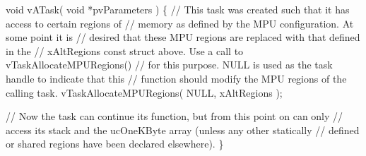 \begin{DoxyPre}void vATask( void *pvParameters )
\{
    // This task was created such that it has access to certain regions of
    // memory as defined by the MPU configuration.  At some point it is
    // desired that these MPU regions are replaced with that defined in the
    // xAltRegions const struct above.  Use a call to vTaskAllocateMPURegions()
    // for this purpose.  NULL is used as the task handle to indicate that this
    // function should modify the MPU regions of the calling task.
    vTaskAllocateMPURegions( NULL, xAltRegions );\end{DoxyPre}



\begin{DoxyPre}    // Now the task can continue its function, but from this point on can only
    // access its stack and the ucOneKByte array (unless any other statically
    // defined or shared regions have been declared elsewhere).
\}
   \end{DoxyPre}
 